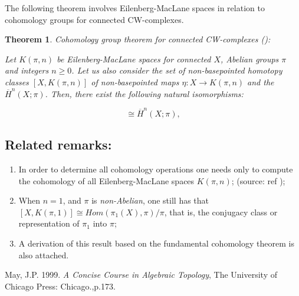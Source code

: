 \documentclass[12pt]{article}
\theoremstyle{plain}
\newtheorem{theorem}{Theorem}[section]
\theoremstyle{definition}
\numberwithin{equation}{section}
\begin{document}
The following theorem involves Eilenberg-MacLane spaces in relation to cohomology groups for
connected CW-complexes. 

\begin{theorem}
 Cohomology group theorem for connected CW-complexes (\cite{MJP1999}):

 Let $K(\pi,n)$ be Eilenberg-MacLane spaces for connected 
 $X$, 
Abelian groups $\pi$ and integers $n \geq 0$. Let us also consider the set of non-basepointed homotopy classes $[X, K(\pi,n)]$ of non-basepointed maps $\eta :X \to K(\pi,n)$ and the  $\overline{H}^n(X;\pi)$. Then, there exist the following \emph{natural isomorphisms}:

\begin{equation}
[X, K(\pi,n)]  \cong \overline{H}^n(X;\pi),
\end{equation}

\end{theorem}

\subsection{Related remarks:}

\begin{enumerate}
\item In order to determine all cohomology operations one needs only to compute the cohomology of all
Eilenberg-MacLane spaces $K(\pi,n)$; (source: ref \cite{MJP1999});

\item When $n = 1$, and $\pi$ is \emph{non-Abelian}, one still has that  $[X,K(\pi ,1)] \cong Hom(\pi_1(X),\pi)/\pi$, that is, the conjugacy class or representation of $\pi_1$ into $\pi$;

\item A derivation of this result based on the fundamental cohomology theorem is also attached.
\end{enumerate}


\begin{thebibliography}{9}

May, J.P. 1999. \emph{A Concise Course in Algebraic Topology}, The University of Chicago Press: Chicago.,p.173.
\end{thebibliography}
\end{document}
